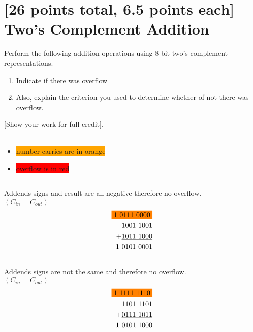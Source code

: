 \documentclass[12pt]{article}
\begin{document}
\section{[26 points total, 6.5 points each] Two's Complement Addition}
Perform the following addition operations using 8-bit two's complement representations.
\begin{enumerate}[label=(\roman*)]
\item Indicate if there was overflow
\item Also, explain the criterion you used to determine whether of not there was overflow.
\end{enumerate}
[Show your work for full credit]. \\ \\
\begin{itemize}
\item \colorbox{orange}{number carries are in orange} 
\item \colorbox{red}{overflow is in red}
\end{itemize}
\subsection{}
Addends signs and result are all negative therefore no overflow.\\
$(C_{in} = C_{out})$
\begin{equation}
	\begin{split}
		\colorbox{orange}{1\ 0111\ 0000} \\ 
		1001\ 1001 \\ 
		+ \underline{1011\ 1000}\\
1\ 0101\ 0001
	\end{split}
\end{equation}

\subsection{}
Addends signs are not the same and therefore no overflow.\\
$(C_{in} = C_{out})$
\begin{equation}
	\begin{split}
		\colorbox{orange}{1\ 1111\ 1110} \\
		1101\ 1101 \\ + \underline{0111\ 1011}\\
		1\ 0101\ 1000
	\end{split}
\end{equation}
\end{document}
